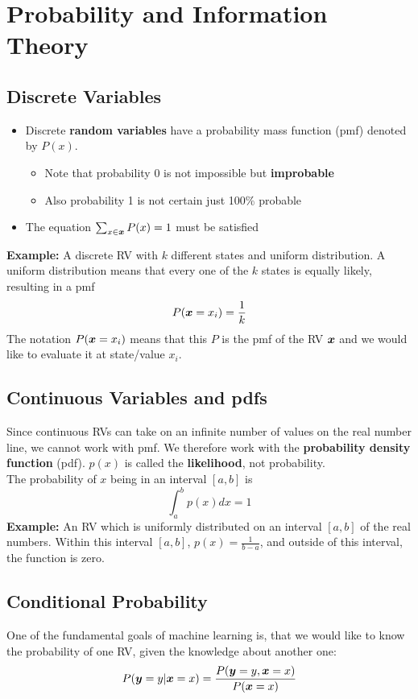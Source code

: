 \section{Probability and Information Theory}
\begin{multicols}{2}
	\subsection{Discrete Variables}
	\begin{itemize}
		\item Discrete \textbf{random variables} have a probability mass function (pmf) denoted by $P(x)$.
		\begin{itemize}
			\item Note that probability 0 is not impossible but \textbf{improbable}
			\item Also probability 1 is not certain just 100\% probable
		\end{itemize}
		\item The equation $ \sum_{x\in \bol{x}} P(x)=1$ must be satisfied
	\end{itemize}
	\textbf{Example:} A discrete RV with $k$ different states and uniform distribution.
	A uniform distribution means that every one of the $k$ states is equally likely, resulting in a pmf
	\[ P(\bol{x}=x_i)=\frac{1}{k} \]
	The notation $P(\bol{x}=x_i)$ means that this $P$ is the pmf of the RV $\bol{x}$ and we would like to evaluate it at state/value $x_i$.

	\subsection{Continuous Variables and pdfs}
	Since continuous RVs can take on an infinite number of values on the real number line, we cannot work with pmf.
	We therefore work with the \textbf{probability density function} (pdf).
	$p(x)$ is called the \textbf{likelihood}, not probability.\\

	The probability of $x$ being in an interval $\left[a,b\right]$ is
	\[ \int_a^b p(x)dx = 1 \]
	\textbf{Example:} An RV which is uniformly distributed on an interval $\left[a,b\right]$ of the real numbers.
	Within this interval $\left[a,b\right]$, $p(x)=\frac{1}{b-a}$, and outside of this interval, the function is zero.

	\subsection{Conditional Probability}
	One of the fundamental goals of machine learning is, that we would like to know the probability of one RV, given the knowledge about another one:
	\[ P(\bol{y}=y|\bol{x}=x)=\frac{P(\bol{y}=y,\bol{x}=x)}{P(\bol{x}=x)} \]


\end{multicols}
